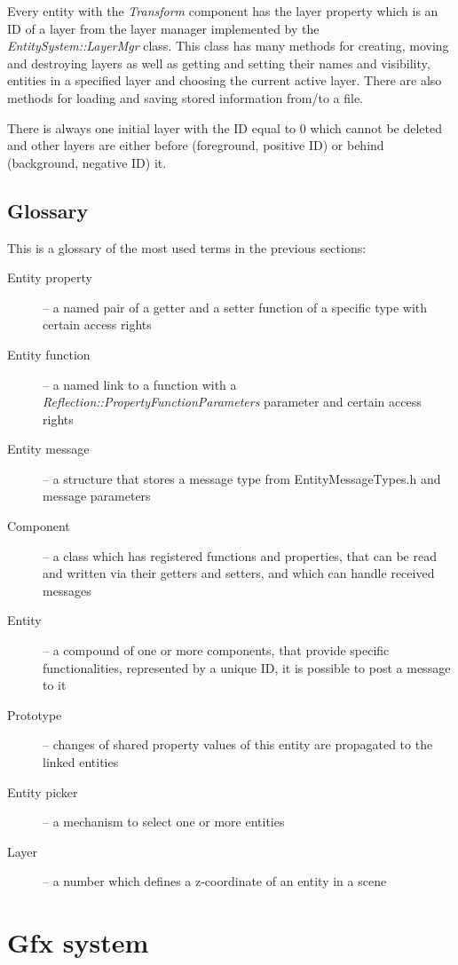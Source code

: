 \documentclass[a4paper, 12pt]{report}
\begin{document}
Every entity with the \emph{Transform} component has the layer property which is an ID of a layer from the layer manager implemented by the \emph{EntitySystem::LayerMgr} class. This class has many methods for creating, moving and destroying layers as well as getting and setting their names and visibility, entities in a specified layer and choosing the current active layer. There are also methods for loading and saving stored information from/to a file.

There is always one initial layer with the ID equal to 0 which cannot be deleted and other layers are either before (foreground, positive ID) or behind (background, negative ID) it.

\section{Glossary}

This is a glossary of the most used terms in the previous sections:

\begin{description}
  \item[Entity property] -- a named pair of a getter and a setter function of a specific type with certain access rights
  \item[Entity function] -- a named link to a function with a \emph{Reflection::Property\-FunctionParameters} parameter and certain access rights
  \item[Entity message] -- a structure that stores a message type from EntityMessageTypes.h and message parameters
  \item[Component] -- a class which has registered functions and properties, that can be read and written via their getters and setters, and which can handle received messages
  \item[Entity] -- a compound of one or more components, that provide specific functionalities, represented by a unique ID, it is possible to post a message to it
  \item[Prototype] -- changes of shared property values of this entity are propagated to the linked entities
  \item[Entity picker] -- a mechanism to select one or more entities
  \item[Layer] -- a number which defines a z-coordinate of an entity in a scene
\end{description}



\chapter{Gfx system}
\end{document}
